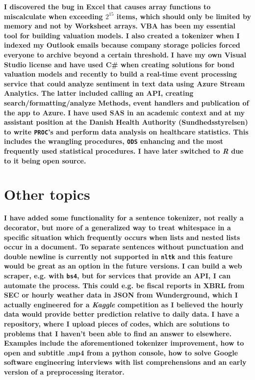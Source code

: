 \documentclass[a4paper]{Meinertsen}
\begin{document}
\begin{cvlatex}
    {\small{\textbf{I discovered the bug in Excel that causes array functions to miscalculate when exceeding $2^{15}$ items, which should only be limited by memory and not by Worksheet arrays. VBA has been my essential tool for building valuation models. I also created a tokenizer when I indexed my Outlook emails because company storage policies forced everyone to archive beyond a certain threshold.}}}
    {\small{\textbf{I have my own Visual Studio license and have used C\# when creating solutions for bond valuation models and recently to build a real-time event processing service that could analyze sentiment in text data using Azure Stream Analytics. The latter included calling an API, creating search/formatting/analyze Methods, event handlers and publication of the app to Azure.}}}
    {\small{\textbf{I have used SAS in an academic context and at my assistant position at the Danish Health Authority (Sundhedsstyrelsen) to write \texttt{PROC}'s and perform data analysis on healthcare statistics. This includes the wrangling procedures, \texttt{ODS} enhancing and the most frequently used statistical procedures. I have later switched to \emph{R} due to it being open source.}}}
\end{cvlatex}

\section{Other topics}

\begin{cvlatex}
    {\small{\textbf{I have added some functionality for a sentence tokenizer, not really a decorator, but more of a generalized way to treat whitespace in a specific situation which frequently occurs when lists and nested lists occur in a document. To separate sentences without punctuation and double newline is currently not supported in \texttt{nltk} and this feature would be great as an option in the future versions. }}}
    {\small{\textbf{I can build a web scraper, e.g. with \texttt{bs4}, but for services that provide an API, I can automate the process. This could e.g. be  fiscal reports in XBRL from SEC or hourly weather data in JSON from Wunderground, which I actually engineered for a \emph{Kaggle} competition as I believed the hourly data would provide better prediction relative to daily data.}}}
    {\small{\textbf{I have a repository, where I upload pieces of codes, which are solutions to problems that I haven't been able to find an answer to elsewhere. Examples include the aforementioned tokenizer improvement, how to open and subtitle .mp4 from a python console, how to solve Google software engineering interviews with list comprehensions and an early version of a preprocessing iterator.}}}
\end{cvlatex}
\end{document}
